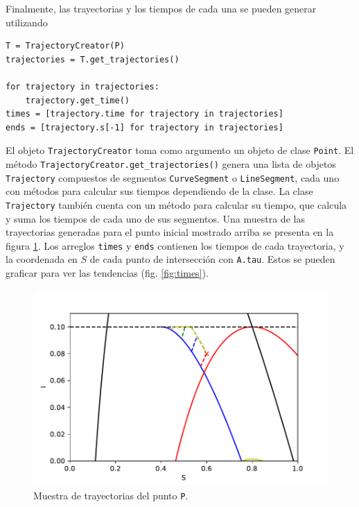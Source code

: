 \documentclass{article}
\begin{document}
Finalmente, las trayectorias y los tiempos de cada una se pueden generar utilizando
\begin{lstlisting}[basicstyle = \ttfamily]
T = TrajectoryCreator(P)
trajectories = T.get_trajectories()

for trajectory in trajectories:
	trajectory.get_time()
times = [trajectory.time for trajectory in trajectories]
ends = [trajectory.s[-1] for trajectory in trajectories]
\end{lstlisting}
El objeto \texttt{TrajectoryCreator} toma como argumento un objeto de clase \texttt{Point}. El método \texttt{TrajectoryCreator.get\_trajectories()} genera una lista de objetos \texttt{Trajectory} compuestos de segmentos \texttt{CurveSegment} o \texttt{LineSegment}, cada uno con métodos para calcular sus tiempos dependiendo de la clase. La clase \texttt{Trajectory} también cuenta con un método para calcular su tiempo, que calcula y suma los tiempos de cada uno de sus segmentos. Una muestra de las trayectorias generadas para el punto inicial mostrado arriba se presenta en la figura \ref{fig:trajectories}. Los arreglos \texttt{times} y \texttt{ends} contienen los tiempos de cada trayectoria, y la coordenada en $S$ de cada punto de intersección con \texttt{A.tau}. Estos se pueden graficar para ver las tendencias (fig. \ref{fig:times}).

\begin{figure}
\includegraphics[width = \textwidth]{trajectories.pdf}
\caption{Muestra de trayectorias del punto \texttt{P}.}
\label{fig:trajectories}
\end{figure}
\end{document}
